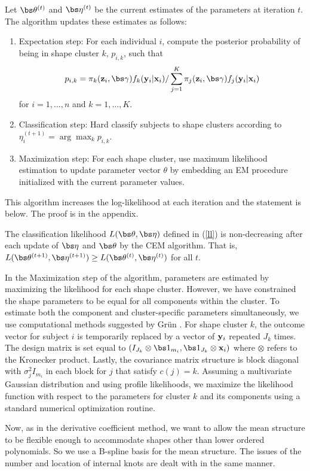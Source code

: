 Let $\bs\theta^{(t)}$ and $\bs\eta^{(t)}$ be the current estimates of the parameters at iteration $t$. The algorithm updates these estimates as follows:
\begin{enumerate}
\item Expectation step: For each individual $i$, compute the posterior probability of being in shape cluster $k$, $p_{i,k}$, such that
$$p_{i,k}= \pi_{k}(\B z_{i},\bs\gamma)f_{k}(\B y_{i}|\B x_{i})/\sum^{K}_{j=1} \pi_{j}(\B z_{i},\bs\gamma)f_{j}(\B y_{i}|\B x_{i})$$
for $i=1,...,n$ and $k=1,...,K$.
\item Classification step: Hard classify subjects to shape clusters according to $\eta^{(t+1)}_{i} = \arg\max_{k} p_{i,k}$.
\item Maximization step: For each shape cluster, use maximum likelihood estimation to update parameter vector $\theta$ by embedding an EM procedure initialized with the current parameter values.
\end{enumerate} 
This algorithm increases the log-likelihood at each iteration and the statement is below. The proof is in the appendix. 
\begin{theorem} The classification likelihood $L(\bs\theta,\bs\eta)$ defined in (\ref{ll}) is non-decreasing after each update of $\bs\eta$ and $\bs\theta$ by the CEM algorithm. That is, $L(\bs\theta^{(t+1)},\bs\eta^{(t+1)}) \geq L(\bs\theta^{(t)},\bs\eta^{(t)})$ for all $t$.
\end{theorem}

In the Maximization step of the algorithm, parameters are estimated by maximizing the likelihood for each shape cluster. However, we have constrained the shape parameters to be equal for all components within the cluster. To estimate both the component and cluster-specific parameters simultaneously, we use computational methods suggested by Gr{\"u}n \cite{grun2008}. For shape cluster $k$, the outcome vector for subject $i$ is temporarily replaced by a vector of $\mathbf y_{i}$ repeated $J_{k}$ times. The design matrix  is set equal to $(I_{J_{k}}\otimes \bs 1_{m_{i}}, \bs 1_{J_{k}} \otimes \B x_{i})$ where $\otimes$ refers to the Kronecker product. Lastly, the covariance matrix structure is block diagonal with $\sigma^{2}_{j}I_{m_{i}}$ in each block for $j$ that satisfy $c(j)=k$. Assuming a multivariate Gaussian distribution and using profile likelihoods, we maximize the likelihood function with respect to the parameters for cluster $k$ and its components using a standard numerical optimization routine.

Now, as in the derivative coefficient method, we want to allow the mean structure to be flexible enough to accommodate shapes other than lower ordered polynomials. So we use a B-spline basis for the mean structure. The issues of the number and location of internal knots are dealt with in the same manner.

